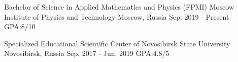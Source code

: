

\begin{cventries}

  
  \cventry
    {Bachelor of Science in Applied Mathematics and Physics (FPMI)} %
    {Moscow Institute of Physics and Technology} %
    {Moscow, Russia} %
    {Sep. 2019 - Present} %
    {
        GPA:8/10
    }
    
    \cventry
    {} %
    {Specialized Educational Scientific Center of Novosibirsk State University} %
    {Novosibirsk, Russia} %
    {Sep. 2017 - Jun. 2019} %
    {
      GPA:4.8/5
    }

\end{cventries}
